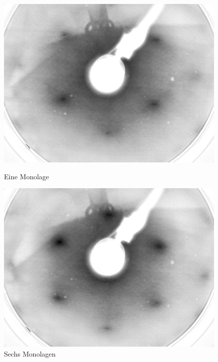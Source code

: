 \begin{figure}[htbp]
	\begin{minipage}[b]{0.5\textwidth} 
		\includegraphics[width=\textwidth]{LEED-Bilder/bearbeitet/1ML_E207}
		\caption{Eine Monolage}
		\label{Bild} 
	\end{minipage}
	\hfill
	\begin{minipage}[b]{0.5\textwidth}
		\includegraphics[width=\textwidth]{LEED-Bilder/bearbeitet/6ML_E207}
		\caption{Sechs Monolagen}
		\label{Bild} 
	\end{minipage}
	

\end{figure}
